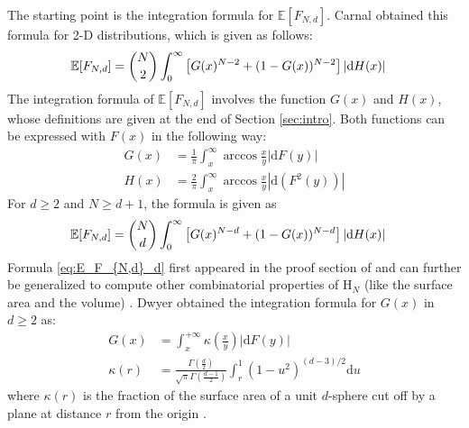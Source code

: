 \documentclass[conference,a4paper]{IEEEtran}
\def\E{\mathbb{E}}
\begin{document}
The starting point is the integration formula for $\E[F_{N,d}]$.
Carnal \cite{carnal1970konvexe}
obtained
this formula for 2-D distributions,
which is given as follows:
\begin{align}
     \E[F_{N,d}] &= \binom{N}{2} \int_0^{\infty} 
     \left[G(x)^{N-2} + (1-G(x))^{N-2} \right]|\mathrm{d} H(x)| 
     \label{eq:E_F_{N,d}_2_d}
\end{align}
The integration formula of $\E[F_{N,d}]$ involves the function $G(x)$ and $H(x)$,
whose definitions are given at the end of Section \ref{sec:intro}.
Both functions can be expressed with $F(x)$ in the following way:
\begin{align}
   G(x) &=\frac{1}{\pi} \int_x^{\infty}\arccos\frac{x}{y} |\mathrm{d} F(y)| \\
     H(x) &= \frac{2}{\pi} \int_x^{\infty} \arccos \frac{x}{y} |\mathrm{d}(F^2(y))|
     \label{eq:H_expression_2_dim}
\end{align}
For $d\geq 2$ and $N\geq d+1$, the formula is given as
\begin{align}
     \E[F_{N,d}] &= \binom{N}{d} \int_0^{\infty} 
     \left[G(x)^{N-d} + (1-G(x))^{N-d} \right]|\mathrm{d} H(x)| 
    \label{eq:E_F_{N,d}_d}
\end{align}
Formula \eqref{eq:E_F_{N,d}_d} first appeared in the proof section of \cite{raynaud1970enveloppe}
and can further be generalized to compute other combinatorial properties of $\mathrm{H}_N$ (like the surface area and the volume)
\cite{barany2008random}.
Dwyer obtained the integration formula for $G(x)$ in $d\geq 2$ as:
\begin{align}\label{eq:G_d_kappa}
     G(x) & = \int_x^{+\infty} \kappa \left(\frac{x}{y} \right) |\mathrm{d}F(y)| \\
     \kappa(r) & = \frac{\Gamma(\frac{d}{2})}
     {\sqrt{\pi}\Gamma(\frac{d-1}{2})}\int_r^{1}
     (1-u^2)^{(d-3)/2}\mathrm{d}u\label{eq:kappa_r}
\end{align}
where $\kappa(r)$ is the fraction of the surface area of a unit $d$-sphere
cut off by a plane at distance $r$ from the origin \cite{dwyer1991convex}.
\end{document}
